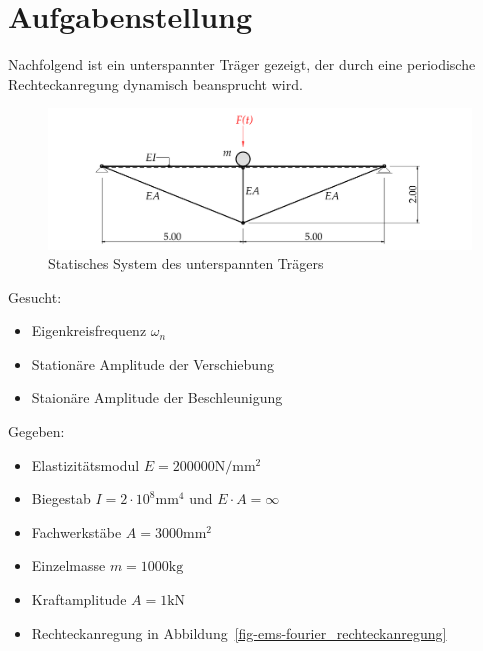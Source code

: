 \documentclass[
  letterpaper,
  DIV=11]{scrreprt}
\providecommand{\tightlist}{%
  \setlength{\itemsep}{0pt}\setlength{\parskip}{0pt}}\usepackage{longtable,booktabs,array}
\begin{document}
\hypertarget{aufgabenstellung-8}{%
\section{Aufgabenstellung}\label{aufgabenstellung-8}}

Nachfolgend ist ein unterspannter Träger gezeigt, der durch eine
periodische Rechteckanregung dynamisch beansprucht wird.

\begin{figure}[H]

{\centering \includegraphics{index_files/mediabag/bilder/aufgabe_ems_fourier_system.pdf}

}

\caption{\label{fig-ems-fourier_system}Statisches System des
unterspannten Trägers}

\end{figure}

Gesucht:

\begin{itemize}
\tightlist
\item
  Eigenkreisfrequenz \(\omega_n\)
\item
  Stationäre Amplitude der Verschiebung
\item
  Staionäre Amplitude der Beschleunigung
\end{itemize}

Gegeben:

\begin{itemize}
\tightlist
\item
  Elastizitätsmodul \(E = 200000 \text{N}/\text{mm}^2\)
\item
  Biegestab \(I = 2\cdot 10^8 \text{mm}^4\) und \(E\cdot A = \infty\)
\item
  Fachwerkstäbe \(A = 3000 \text{mm}^2\)
\item
  Einzelmasse \(m=1000 \text{kg}\)
\item
  Kraftamplitude \(A = 1 \text{kN}\)
\item
  Rechteckanregung in Abbildung~\ref{fig-ems-fourier_rechteckanregung}
\end{itemize}
\end{document}
